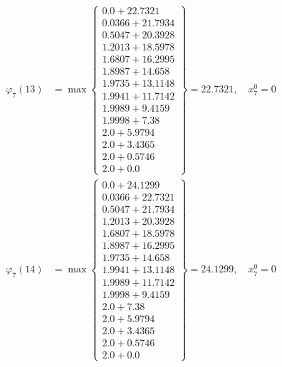 \documentclass{article}
\begin{document}
\begin{align*}
  
  
  
\varphi_{7}(13) &= \max \left\{ \begin{array}{c}
0.0 + 22.7321 \\
 0.0366 + 21.7934 \\
 0.5047 + 20.3928 \\
 1.2013 + 18.5978 \\
 1.6807 + 16.2995 \\
 1.8987 + 14.658 \\
 1.9735 + 13.1148 \\
 1.9941 + 11.7142 \\
 1.9989 + 9.4159 \\
 1.9998 + 7.38 \\
 2.0 + 5.9794 \\
 2.0 + 3.4365 \\
 2.0 + 0.5746 \\
 2.0 + 0.0
\end{array} \right\}=22.7321,\quad x_{7}^0=0\\
  
  
  
  
\varphi_{7}(14) &= \max \left\{ \begin{array}{c}
0.0 + 24.1299 \\
 0.0366 + 22.7321 \\
 0.5047 + 21.7934 \\
 1.2013 + 20.3928 \\
 1.6807 + 18.5978 \\
 1.8987 + 16.2995 \\
 1.9735 + 14.658 \\
 1.9941 + 13.1148 \\
 1.9989 + 11.7142 \\
 1.9998 + 9.4159 \\
 2.0 + 7.38 \\
 2.0 + 5.9794 \\
 2.0 + 3.4365 \\
 2.0 + 0.5746 \\
 2.0 + 0.0
\end{array} \right\}=24.1299,\quad x_{7}^0=0\\
  
  
  

\end{align*}
\end{document}
